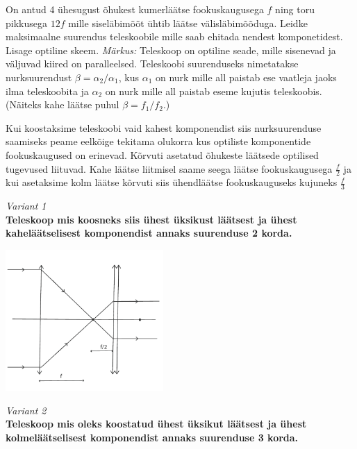 \setAuthor{}

On antud 4 ühesugust õhukest kumerläätse fookuskaugusega $f$ ning toru pikkusega $12f$ mille siseläbimõõt ühtib läätse välisläbimõõduga. Leidke maksimaalne suurendus teleskoobile mille saab ehitada nendest komponetidest. Lisage optiline skeem. 
\emph{Märkus:} Teleskoop on optiline seade, mille sisenevad ja väljuvad kiired on paralleelsed. Teleskoobi suurenduseks nimetatakse nurksuurendust $ \beta = {\alpha}_{2} / {\alpha}_{1}$, kus $\alpha_1$ on nurk mille all paistab ese vaatleja jaoks ilma teleskoobita ja $\alpha_2$ on nurk mille all paistab eseme kujutis teleskoobis. (Näiteks kahe läätse puhul $ \beta = f_1 / f_2 $.)



\hint

\solu
Kui koostaksime teleskoobi vaid kahest komponendist siis nurksuurenduse saamiseks peame eelkõige tekitama olukorra kus optiliste komponentide fookuskaugused on erinevad.
Kõrvuti asetatud õhukeste läätsede optilised tugevused liituvad. Kahe läätse liitmisel saame seega läätse fookuskaugusega $ \frac{f}{2} $ ja kui asetaksime kolm läätse kõrvuti siis ühendläätse fookuskauguseks kujuneks $ \frac{f}{3} $

\vspace{20pt}
\emph{Variant 1}\\
\textbf{Teleskoop mis koosneks siis ühest üksikust läätsest ja ühest kaheläätselisest komponendist annaks suurenduse 2 korda.}

\vspace{-10pt}
  \begin{center}
    \includegraphics[width=0.45\textwidth]{2020-v2g-10-sol1.pdf}
  \end{center}
  \vspace{-10pt}
  


\emph{Variant 2}\\
\textbf{Teleskoop mis oleks koostatud ühest üksikut läätsest ja ühest kolmeläätselisest komponendist annaks suurenduse 3 korda.}

